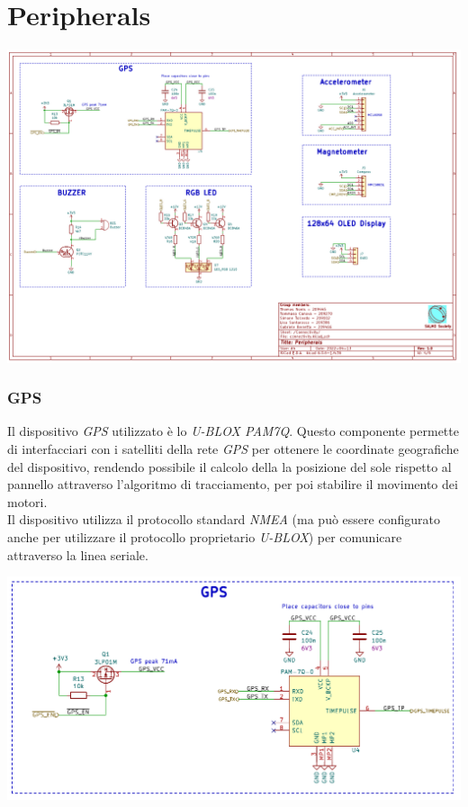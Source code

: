 \hypertarget{peripherals}{%
\section{Peripherals}\label{peripherals}}

\begin{center}
\includegraphics[scale=0.5]{figures/image15.png}
\captionsetup{type=figure}
\end{center}

\hypertarget{gps}{%
\subsubsection{\texorpdfstring{GPS}{GPS}}\label{gps}}

Il dispositivo \emph{GPS} utilizzato è lo \emph{U-BLOX PAM7Q}. Questo
componente permette di interfacciari con i satelliti della rete \emph{GPS}
per ottenere le coordinate geografiche del dispositivo, rendendo possibile 
il calcolo della la posizione del sole rispetto al
pannello attraverso l'algoritmo di tracciamento, per poi
stabilire il movimento dei motori.\\
Il dispositivo utilizza il protocollo standard \emph{NMEA} (ma può
essere configurato anche per utilizzare il protocollo proprietario
\emph{U-BLOX}) per comunicare attraverso la linea seriale.

\begin{center}
\includegraphics[scale=0.5]{figures/image26.png}
\captionsetup{type=figure}
\end{center}

